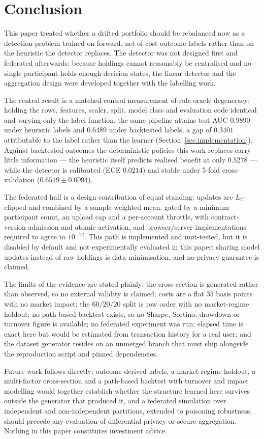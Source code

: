 \section{Conclusion}
\label{sec:conclusion}

This paper treated whether a drifted portfolio should be rebalanced now as a
detection problem trained on forward, net-of-cost outcome labels rather than
on the heuristic the detector replaces. The detector was not designed first
and federated afterwards: because holdings cannot reasonably be centralised
and no single participant holds enough decision states, the linear detector
and the aggregation design were developed together with the labelling work.

The central result is a matched-control measurement of rule-oracle
degeneracy: holding the rows, features, scaler, split, model class and
evaluation code identical and varying only the label function, the same
pipeline attains test AUC $0.9890$ under heuristic labels and $0.6489$ under
backtested labels, a gap of $0.3401$ attributable to the label rather than the
learner (Section~\ref{sec:implementation}). Against backtested outcomes the
deterministic policies this work replaces carry little information --- the
heuristic itself predicts realised benefit at only $0.5278$ --- while the
detector is calibrated (ECE $0.0214$) and stable under 5-fold cross-validation
($0.6519\pm0.0094$).

The federated half is a design contribution of equal standing: updates are
$L_2$-clipped and combined by a sample-weighted mean, gated by a minimum
participant count, an upload cap and a per-account throttle, with
contract-version admission and atomic activation, and browser/server
implementations required to agree to $10^{-12}$. This path is implemented and
unit-tested, but it is disabled by default and not experimentally evaluated in
this paper; sharing model updates instead of raw holdings is data
minimisation, and no privacy guarantee is claimed.

The limits of the evidence are stated plainly: the cross-section is generated
rather than observed, so no external validity is claimed; costs are a flat
$35$ basis points with no market impact; the $60/20/20$ split is row order
with no market-regime holdout; no path-based backtest exists, so no Sharpe,
Sortino, drawdown or turnover figure is available; no federated experiment
was run; elapsed time is exact here but would be estimated from transaction
history for a real user; and the dataset generator resides on an unmerged
branch that must ship alongside the reproduction script and pinned
dependencies.

Future work follows directly: outcome-derived labels, a market-regime
holdout, a multi-factor cross-section and a path-based backtest with turnover
and impact modelling would together establish whether the structure learned
here survives outside the generator that produced it, and a federated
simulation over independent and non-independent partitions, extended to
poisoning robustness, should precede any evaluation of differential privacy
or secure aggregation. Nothing in
this paper constitutes investment advice.
